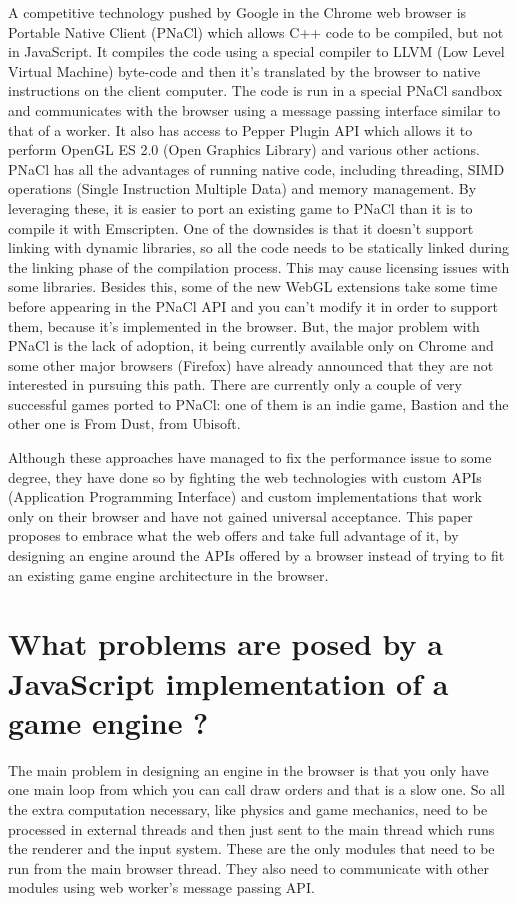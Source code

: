 A competitive technology pushed by Google in the Chrome web browser is Portable Native Client (PNaCl) which allows C++ code to be compiled, but not in JavaScript. It compiles the code using a special compiler to LLVM (Low Level Virtual Machine) byte-code and then it's translated by the browser to native instructions on the client computer. The code is run in a special PNaCl sandbox and communicates with the browser using a message passing interface similar to that of a worker. It also has access to Pepper Plugin API which allows it to perform OpenGL ES 2.0 (Open Graphics Library) and various other actions. PNaCl has all the advantages of running native code, including threading, SIMD operations (Single Instruction Multiple Data) and memory management. By leveraging these, it is easier to port an existing game to PNaCl than it is to compile it with Emscripten. One of the downsides is that it doesn't support linking with dynamic libraries, so all the code needs to be statically linked during the linking phase of the compilation process. This may cause licensing issues with some libraries. Besides this, some of the new WebGL extensions take some time before appearing in the PNaCl API and you can't modify it in order to support them, because it's implemented in the browser. But, the major problem with PNaCl is the lack of adoption, it being currently available only on Chrome and some other major browsers (Firefox) have already announced that they are not interested in pursuing this path. There are currently only a couple of very successful games ported to PNaCl: one of them is an indie game, Bastion and the other one is From Dust, from Ubisoft.


Although these approaches have managed to fix the performance issue to some degree, they have done so by fighting the web technologies with custom APIs (Application Programming Interface) and custom implementations that work only on their browser and have not gained universal acceptance. This paper proposes to embrace what the web offers and take full advantage of it, by designing an engine around the APIs offered by a browser instead of trying to fit an existing game engine architecture in the browser.


\section{What problems are posed by a JavaScript implementation of a game engine ?}
\label{sec:game engine}

The main problem in designing an engine in the browser is that you only have one main loop from which you can call draw orders and that is a slow one. So all the extra computation necessary, like physics and game mechanics, need to be processed in external threads and then just sent to the main thread which runs the renderer and the input system. These are the only modules that need to be run from the main browser thread. They also need to communicate with other modules using web worker's message passing API.

